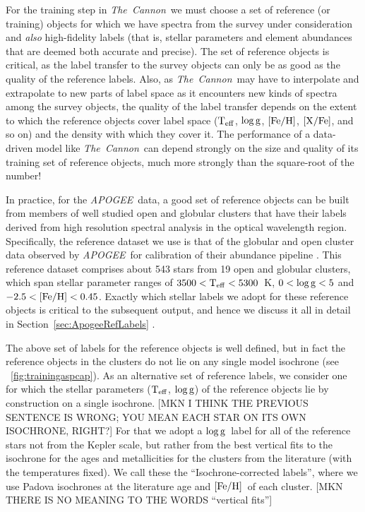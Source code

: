 \documentclass[12pt, preprint]{aastex}
\newcommand{\sectionname}{Section}
\newcommand{\teff}{\mbox{$\rm T_{eff}$}}
\newcommand{\feh}{\mbox{$\rm [Fe/H]$}}
\newcommand{\xfe}{\mbox{$\rm [X/Fe]$}}
\newcommand{\logg}{\mbox{$\rm \log g$}}
\newcommand{\tc}{\textsl{The~Cannon}}
\newcommand{\apogee}{\textsl{APOGEE}}
\begin{document}
For the training step in \tc\ we must choose a set of reference (or training) objects for which we have spectra from the survey under consideration and \emph{also} high-fidelity labels (that is, stellar parameters and element abundances that are deemed both accurate and precise).
The set of reference objects is critical, as the label transfer to the survey objects can only be as good as the quality of the reference labels. 
Also, as \tc\ may have to interpolate and extrapolate to new parts of label space as
it encounters new kinds of spectra among the survey objects, the quality
of the label transfer depends on the extent to which the reference objects
cover label space (\teff, \logg, \feh, \xfe, and so on) and the density with which they cover it.
The performance of a data-driven model like \tc\ can depend strongly on the size and quality of its training set of reference objects, much more strongly than the square-root of the number!

In practice, for the \apogee\ data,
a good set of reference objects can be built from 
members of well studied open and globular clusters that have their labels derived from high resolution spectral analysis in the
optical wavelength region.
Specifically, the reference dataset we use is that of the globular and open cluster data observed by \apogee\ for calibration of their abundance pipeline \citep{Meszaros2013}. 
This reference dataset comprises about 543 stars from 19 open and globular clusters, which span stellar parameter ranges 
of $3500<\teff<5300$~K, $0<\logg<5$ and $-2.5<\feh<0.45$. 
Exactly which stellar labels we adopt for these reference objects is critical to the subsequent output, and hence we discuss it all in detail in \sectionname~\ref{sec:ApogeeRefLabels} .


The above set of labels for the reference objects is well defined,
but in fact the reference objects in the clusters do not lie on any single model isochrone 
(see \figurename~\ref{fig:trainingaspcap}). 
As an alternative set of reference labels, we consider one for which the stellar parameters (\teff , \logg ) of the reference objects lie by construction on a single isochrone.
[MKN I THINK THE PREVIOUS SENTENCE IS WRONG; YOU MEAN EACH STAR ON ITS OWN ISOCHRONE, RIGHT?]
For that we adopt a \logg\ label for all of the reference stars not from the Kepler scale, but rather from the best vertical fits to the isochrone for the ages and metallicities for the clusters from the literature (with the temperatures fixed). We call these the ``Isochrone-corrected labels'', where we use Padova isochrones at the literature age and \feh\ of each cluster. 
[MKN THERE IS NO MEANING TO THE WORDS ``vertical fits'']
\end{document}
